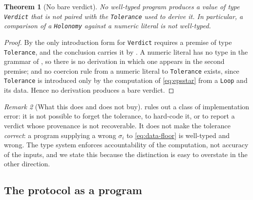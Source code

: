 \documentclass[11pt,twocolumn,a4paper]{article}
\theoremstyle{pstyle}
\newtheorem{theorem}{Theorem}[section]
\theoremstyle{definition}
\theoremstyle{remark}
\newtheorem{remark}[theorem]{Remark}
\newcommand{\cf}[1]{\texttt{#1}}
\begin{document}
\begin{theorem}[No bare verdict]
\label{thm:no-bare-verdict}
No well-typed program produces a value of type \cf{Verdict} that is not
paired with the \cf{Tolerance} used to derive it. In particular, a
comparison of a \cf{Holonomy} against a numeric literal is not
well-typed.
\end{theorem}

\begin{proof}
By  the only introduction form for \cf{Verdict}
requires a premise of type \cf{Tolerance}, and the conclusion carries it
by . A numeric literal has no type in the grammar of
, so there is no derivation in which one appears in
the second premise; and no coercion rule from a numeric literal to
\cf{Tolerance} exists, since \cf{Tolerance} is introduced only by the
computation of \eqref{eq:epsstar} from a \cf{Loop} and its data. Hence
no derivation produces a bare verdict.
\end{proof}

\begin{remark}[What this does and does not buy]
\label{rem:type-limits}
 rules out a class of implementation error:
it is not possible to forget the tolerance, to hard-code it, or to
report a verdict whose provenance is not recoverable. It does not make
the tolerance \emph{correct}: a program supplying a wrong $\sigma_i$ to
\eqref{eq:data-floor} is well-typed and wrong. The type system enforces
accountability of the computation, not accuracy of the inputs, and we
state this because the distinction is easy to overstate in the other
direction.
\end{remark}

\subsection{The protocol as a program}
\end{document}
